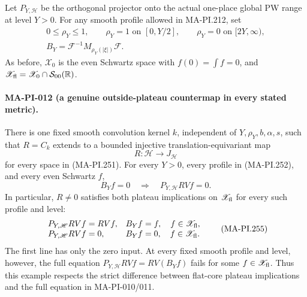 Let \(P_{Y,\mathscr H}\) be the orthogonal projector onto
the actual one-place global PW range at level \(Y>0\).
For any smooth profile allowed in MA-PI.212, set
\[
 \begin{gathered}
 0\le\rho_Y\le1,\qquad
 \rho_Y=1\text{ on }[0,Y/2],\qquad
 \rho_Y=0\text{ on }[2Y,\infty),\\
 B_Y=\mathcal F^{-1}M_{\rho_Y(|\xi|)}\mathcal F.
 \end{gathered}
 \tag{MA-PI.252}
\]
As before, \(\mathscr X_0\) is the even Schwartz space
with \(f(0)=\int f=0\), and
\(\mathscr X_{\rm fl}=\mathscr X_0\cap\mathcal S_{00}(\mathbb R)\).

\paragraph{MA-PI-012 (a genuine outside-plateau countermap in every stated metric).}
There is one fixed smooth convolution kernel \(k\), independent
of \(Y,\rho_Y,b,\alpha,s\), such that \(R=C_k\) extends to
a bounded injective translation-equivariant map
\[
                 R:\mathscr H\longrightarrow J_{\mathscr H}
 \tag{MA-PI.253}
\]
for every space in (MA-PI.251).  For every \(Y>0\), every
profile in (MA-PI.252), and every even Schwartz \(f\),
\[
       B_Yf=0\quad\Longrightarrow\quad P_{Y,\mathscr H}RVf=0.
 \tag{MA-PI.254}
\]
In particular, \(R\ne0\) satisfies both plateau implications
on \(\mathscr X_{\rm fl}\) for every such profile and level:
\[
 \begin{array}{ll}
 P_{Y,\mathscr H}RVf=RVf,& B_Yf=f,\quad f\in\mathscr X_{\rm fl},\\
 P_{Y,\mathscr H}RVf=0,& B_Yf=0,\quad f\in\mathscr X_{\rm fl}.
 \end{array}
 \tag{MA-PI.255}
\]
The first line has only the zero input.  At every fixed
smooth profile and level, however, the full equation
\(P_{Y,\mathscr H}RVf=RV(B_Yf)\) fails for some
\(f\in\mathscr X_{\rm fl}\).  Thus this example respects
the strict difference between flat-core plateau implications
and the full equation in MA-PI-010/011.

